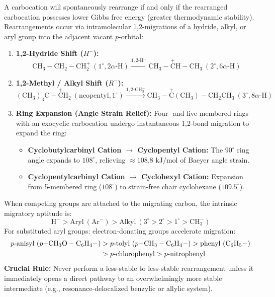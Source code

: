 \documentclass[10pt,a4paper]{article}
\begin{document}
\begin{formulabox}
A carbocation will spontaneously rearrange if and only if the rearranged carbocation possesses lower Gibbs free energy (greater thermodynamic stability). Rearrangements occur via intramolecular 1,2-migrations of a hydride, alkyl, or aryl group into the adjacent vacant $p$-orbital:
\begin{enumerate}[leftmargin=*]
  \item \textbf{1,2-Hydride Shift ($H^-$):}
  \begin{equation}
    \mathrm{CH_3-CH_2-CH_2^+} \ (1^\circ, 2\alpha\text{-H}) \xrightarrow{1,2\text{-H}^-} \mathrm{CH_3-\overset{+}{C}H-CH_3} \ (2^\circ, 6\alpha\text{-H})
  \end{equation}
  \item \textbf{1,2-Methyl / Alkyl Shift ($R^-$):}
  \begin{equation}
    \mathrm{(CH_3)_3C-\overset{+}{C}H_2} \ (\text{neopentyl}, 1^\circ) \xrightarrow{1,2\text{-CH}_3^-} \mathrm{CH_3-\overset{+}{C}(CH_3)-CH_2CH_3} \ (3^\circ, 8\alpha\text{-H})
  \end{equation}
  \item \textbf{Ring Expansion (Angle Strain Relief):}
  Four- and five-membered rings with an exocyclic carbocation undergo instantaneous 1,2-bond migration to expand the ring:
  \begin{itemize}
    \item \textbf{Cyclobutylcarbinyl Cation $\to$ Cyclopentyl Cation:} The $90^\circ$ ring angle expands to $108^\circ$, relieving $\approx 108.8\text{ kJ/mol}$ of Baeyer angle strain.
    \item \textbf{Cyclopentylcarbinyl Cation $\to$ Cyclohexyl Cation:} Expansion from 5-membered ring ($108^\circ$) to strain-free chair cyclohexane ($109.5^\circ$).
  \end{itemize}
\end{enumerate}
\end{formulabox}

\begin{trapbox}
When competing groups are attached to the migrating carbon, the intrinsic migratory aptitude is:
\begin{equation}
  \mathrm{H}^- > \mathrm{Aryl} \ (\mathrm{Ar}^-) > \mathrm{Alkyl} \ (3^\circ > 2^\circ > 1^\circ > \mathrm{CH_3^-})
\end{equation}
For substituted aryl groups: electron-donating groups accelerate migration:
\begin{align}
  p\text{-anisyl } (p\mathrm{-CH_3O-C_6H_4-}) &> p\text{-tolyl } (p\mathrm{-CH_3-C_6H_4-}) > \text{phenyl } (\mathrm{C_6H_5-}) \notag \\
  &> p\text{-chlorophenyl} > p\text{-nitrophenyl}
\end{align}
\textbf{Crucial Rule:} Never perform a less-stable to less-stable rearrangement unless it immediately opens a direct pathway to an overwhelmingly more stable intermediate (e.g., resonance-delocalized benzylic or allylic system).
\end{trapbox}
\end{document}
